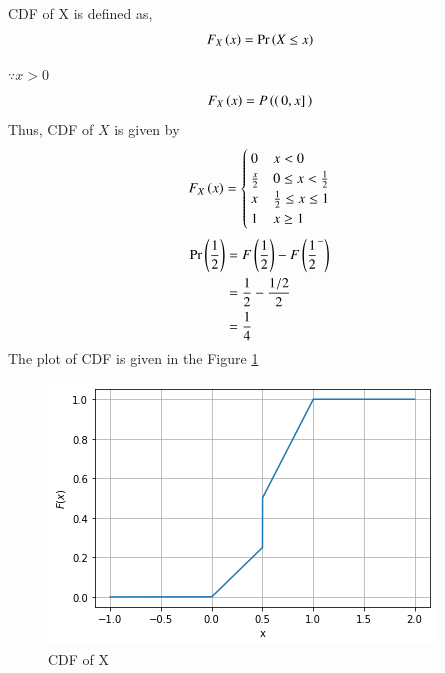

CDF of X is defined as,
\begin{align}
    F_X\left(x\right)=\Pr\left(X \le x\right)
\end{align}

$\because x > 0$
\begin{align}
    F_X\left(x\right)=P\left((\,0,x]\,\right)
\end{align}
Thus, CDF of $X$ is given by
\begin{align}
    F_X\left(x\right) =
    \begin{cases}
    0 & x < 0\\
    \frac{x}{2} & 0 \le x < \frac{1}{2}\\
     x & \frac{1}{2} \le x \le 1\\
     1 & x\geq 1
    \end{cases}
\end{align}
\begin{align}
    \Pr\left(\frac{1}{2}\right) & = F\left(\frac{1}{2}\right) - F\left(\frac{1}{2}^{-}\right)\\
    & = \frac{1}{2} - \frac{1/2}{2}\\
    & = \frac{1}{4}
\end{align}
The plot of CDF is given in the Figure \ref{ma2015-27:fig:cdf}

\begin{figure}[h!]
\centering
\includegraphics[width=\columnwidth]{solutions/ma/2015/27/Figure/fig4.png}
\caption{CDF of X}
\label{ma2015-27:fig:cdf}
\end{figure}

   

